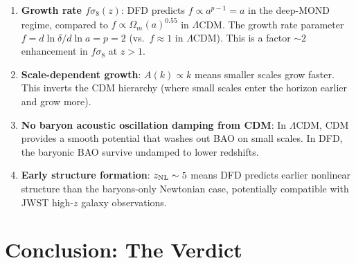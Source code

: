 \documentclass[11pt]{article}
\newcommand{\LCDM}{$\Lambda$CDM}
\begin{document}
\begin{enumerate}
\item \textbf{Growth rate $f\sigma_8(z)$}: DFD predicts $f \propto a^{p-1}
  = a$ in the deep-MOND regime, compared to $f \propto \Omega_m(a)^{0.55}$
  in \LCDM. The growth rate parameter $f = d\ln\delta/d\ln a = p = 2$
  (vs.\ $f \approx 1$ in \LCDM). This is a factor $\sim 2$ enhancement
  in $f\sigma_8$ at $z > 1$.

\item \textbf{Scale-dependent growth}: $A(k) \propto k$ means smaller
  scales grow faster. This inverts the CDM hierarchy (where small scales
  enter the horizon earlier and grow more).

\item \textbf{No baryon acoustic oscillation damping from CDM}:
  In \LCDM, CDM provides a smooth potential that washes out BAO
  on small scales. In DFD, the baryonic BAO survive undamped to
  lower redshifts.

\item \textbf{Early structure formation}: $z_{\rm NL} \sim 5$ means
  DFD predicts earlier nonlinear structure than the baryons-only
  Newtonian case, potentially compatible with JWST high-$z$ galaxy
  observations.
\end{enumerate}


\section*{Conclusion: The Verdict}
\end{document}
